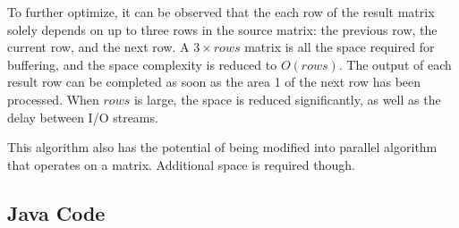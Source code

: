 To further optimize, it can be observed that the each row of the result matrix
solely depends on up to three rows in the source matrix: the previous row, the
current row, and the next row. A $3 \times rows$ matrix is all the space
required for buffering, and the space complexity is reduced to $O(rows)$. The
output of each result row can be completed as soon as the area 1 of the next
row has been processed. When $rows$ is large, the space is reduced
significantly, as well as the delay between I/O streams.

This algorithm also has the potential of being modified into parallel algorithm
that operates on a matrix. Additional space is required though.

\subsection{Java Code}


